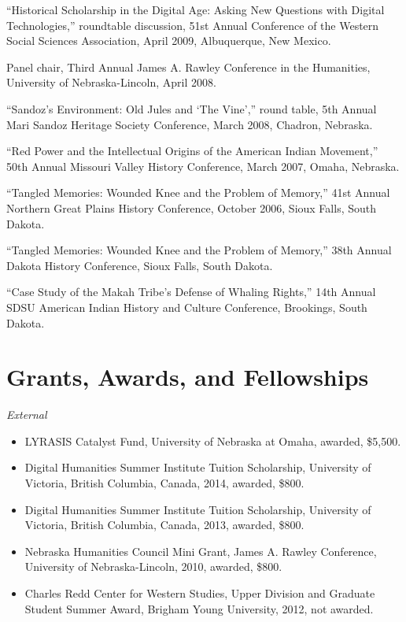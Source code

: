 ``Historical Scholarship in the Digital Age: Asking New Questions with
Digital Technologies,'' roundtable discussion, 51st Annual Conference of
the Western Social Sciences Association, April 2009, Albuquerque, New
Mexico.

Panel chair, Third Annual James A. Rawley Conference in the Humanities,
University of Nebraska-Lincoln, April 2008.

``Sandoz's Environment: Old Jules and `The Vine','' round table, 5th
Annual Mari Sandoz Heritage Society Conference, March 2008, Chadron,
Nebraska.

``Red Power and the Intellectual Origins of the American Indian
Movement,'' 50th Annual Missouri Valley History Conference, March 2007,
Omaha, Nebraska.

``Tangled Memories: Wounded Knee and the Problem of Memory,'' 41st
Annual Northern Great Plains History Conference, October 2006, Sioux
Falls, South Dakota.

``Tangled Memories: Wounded Knee and the Problem of Memory,'' 38th
Annual Dakota History Conference, Sioux Falls, South Dakota.

``Case Study of the Makah Tribe's Defense of Whaling Rights,'' 14th
Annual SDSU American Indian History and Culture Conference, Brookings,
South Dakota.

\section{Grants, Awards, and
Fellowships}\label{grants-awards-and-fellowships}

\emph{External}

\begin{itemize}
\tightlist
\item
  LYRASIS Catalyst Fund, University of Nebraska at Omaha, awarded,
  \$5,500.
\item
  Digital Humanities Summer Institute Tuition Scholarship, University of
  Victoria, British Columbia, Canada, 2014, awarded, \$800.
\item
  Digital Humanities Summer Institute Tuition Scholarship, University of
  Victoria, British Columbia, Canada, 2013, awarded, \$800.
\item
  Nebraska Humanities Council Mini Grant, James A. Rawley Conference,
  University of Nebraska-Lincoln, 2010, awarded, \$800.
\item
  Charles Redd Center for Western Studies, Upper Division and Graduate
  Student Summer Award, Brigham Young University, 2012, not awarded.
\end{itemize}

